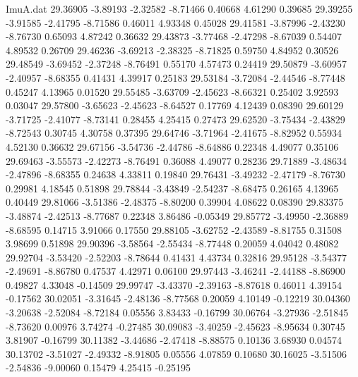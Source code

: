\begin{filecontents}{ImuA.dat}
  29.36905   -3.89193   -2.32582   -8.71466    0.40668    4.61290    0.39685
  29.39255   -3.91585   -2.41795   -8.71586    0.46011    4.93348    0.45028
  29.41581   -3.87996   -2.43230   -8.76730    0.65093    4.87242    0.36632
  29.43873   -3.77468   -2.47298   -8.67039    0.54407    4.89532    0.26709
  29.46236   -3.69213   -2.38325   -8.71825    0.59750    4.84952    0.30526
  29.48549   -3.69452   -2.37248   -8.76491    0.55170    4.57473    0.24419
  29.50879   -3.60957   -2.40957   -8.68355    0.41431    4.39917    0.25183
  29.53184   -3.72084   -2.44546   -8.77448    0.45247    4.13965    0.01520
  29.55485   -3.63709   -2.45623   -8.66321    0.25402    3.92593    0.03047
  29.57800   -3.65623   -2.45623   -8.64527    0.17769    4.12439    0.08390
  29.60129   -3.71725   -2.41077   -8.73141    0.28455    4.25415    0.27473
  29.62520   -3.75434   -2.43829   -8.72543    0.30745    4.30758    0.37395
  29.64746   -3.71964   -2.41675   -8.82952    0.55934    4.52130    0.36632
  29.67156   -3.54736   -2.44786   -8.64886    0.22348    4.49077    0.35106
  29.69463   -3.55573   -2.42273   -8.76491    0.36088    4.49077    0.28236
  29.71889   -3.48634   -2.47896   -8.68355    0.24638    4.33811    0.19840
  29.76431   -3.49232   -2.47179   -8.76730    0.29981    4.18545    0.51898
  29.78844   -3.43849   -2.54237   -8.68475    0.26165    4.13965    0.40449
  29.81066   -3.51386   -2.48375   -8.80200    0.39904    4.08622    0.08390
  29.83375   -3.48874   -2.42513   -8.77687    0.22348    3.86486   -0.05349
  29.85772   -3.49950   -2.36889   -8.68595    0.14715    3.91066    0.17550
  29.88105   -3.62752   -2.43589   -8.81755    0.31508    3.98699    0.51898
  29.90396   -3.58564   -2.55434   -8.77448    0.20059    4.04042    0.48082
  29.92704   -3.53420   -2.52203   -8.78644    0.41431    4.43734    0.32816
  29.95128   -3.54377   -2.49691   -8.86780    0.47537    4.42971    0.06100
  29.97443   -3.46241   -2.44188   -8.86900    0.49827    4.33048   -0.14509
  29.99747   -3.43370   -2.39163   -8.87618    0.46011    4.39154   -0.17562
  30.02051   -3.31645   -2.48136   -8.77568    0.20059    4.10149   -0.12219
  30.04360   -3.20638   -2.52084   -8.72184    0.05556    3.83433   -0.16799
  30.06764   -3.27936   -2.51845   -8.73620    0.00976    3.74274   -0.27485
  30.09083   -3.40259   -2.45623   -8.95634    0.30745    3.81907   -0.16799
  30.11382   -3.44686   -2.47418   -8.88575    0.10136    3.68930    0.04574
  30.13702   -3.51027   -2.49332   -8.91805    0.05556    4.07859    0.10680
  30.16025   -3.51506   -2.54836   -9.00060    0.15479    4.25415   -0.25195

\end{filecontents}
